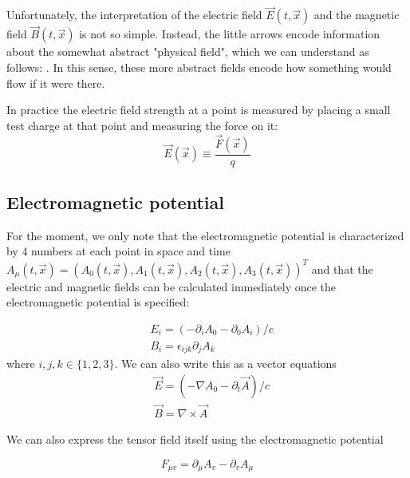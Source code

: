 Unfortunately, the interpretation of the electric field $\vec{E}(t, \vec{x})$ and the magnetic field $\vec{B}(t, \vec{x})$ is not so simple. Instead, the little arrows encode information about the somewhat abstract "physical field", which we can understand as follows: . In this sense, these more abstract fields encode how something would
flow if it were there.
\begin{qt}
    In practice the electric field strength at a point is measured by placing a small test charge at that point and measuring the force on it:
    \begin{equation}
\vec{E}(\vec{x}) \equiv \frac{\vec{F}(\vec{x})}{q}
\end{equation}
\end{qt}
\subsection{Electromagnetic potential}
For the moment, we only note that the electromagnetic potential is characterized by 4 numbers at each point in space and time $A_{\mu}(t, \vec{x})=\left(A_{0}(t, \vec{x}), A_{1}(t, \vec{x}), A_{2}(t, \vec{x}), A_{3}(t, \vec{x})\right)^{T}$ and that the electric and magnetic fields can be calculated immediately once the electromagnetic potential is specified:
\begin{qt}
    \begin{equation}
\begin{aligned}
&E_{i}=\left(-\partial_{i} A_{0}-\partial_{0} A_{i}\right) / c\\
&B_{i}=\epsilon_{i j k} \partial_{j} A_{k}
\end{aligned}
\end{equation}
where $i, j, k \in\{1,2,3\} .$ We can also write this as a vector equations
\begin{equation}
\begin{aligned}
&\vec{E}=\left(-\nabla A_{0}-\partial_{t} \vec{A}\right) / c\\
&\vec{B}=\nabla \times \vec{A}
\end{aligned}
\end{equation}
\end{qt}
We can also express the tensor field itself using the electromagnetic potential
\begin{qt}
    \begin{equation}
F_{\mu v}=\partial_{\mu} A_{v}-\partial_{v} A_{\mu}
\end{equation}
\end{qt}

